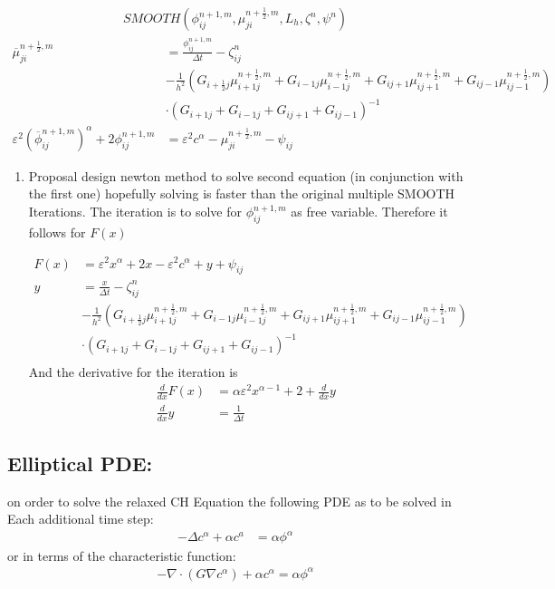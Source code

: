 \documentclass[11pt]{article}
\begin{document}
\begin{align*}
SMOOTH( \phi^{n+1,m}_{ij}, \mu^{n + \frac{1}{2},m}_{ji}, L_h , \zeta ^n , \psi ^n )
\end{align*}
\begin{align*}
\overline{\mu}^{n + \frac{1}{2},m}_{ji}
&=
  \frac{\phi ^{n+1,m}_{ij}}{\Delta t} - \zeta^n_{ij} \\
&- \frac{1}{h^2}(G_{i+\frac{1}{2}j} \mu^{n + \frac{1}{2},m}_{i+1j} +  G_{i-1j} \mu^{n + \frac{1}{2},m}_{i-1j} + G_{ij+1}  \mu^{n + \frac{1}{2},m}_{ij+1} + G_{ij-1} \mu^{n + \frac{1}{2},m}_{ij-1}) \\
&\cdot  (G_{i+1j} + G_{i-1j} + G_{ij+1} + G_{ij-1})^{-1} \\
 \varepsilon ^2 (\overline{\phi} ^{n+1,m}_{ij})^\alpha + 2 \phi ^{n+1,m}_{ij} &= \varepsilon ^2 c^\alpha  -\mu^{n + \frac{1}{2},m}_{ji}  - \psi_{ij}
\end{align*}
\begin{enumerate}
\item Proposal
\label{sec:orgf2731af}
design newton method to solve second equation (in conjunction with the first one) hopefully solving is faster than the original multiple SMOOTH Iterations.
 The iteration is to solve for \(\phi ^{n+1,m}_{ij}\) as free variable. Therefore it follows for \(F(x)\)

\begin{align*}
F(x)  &= \varepsilon ^2 x^\alpha + 2x - \varepsilon^2 c^\alpha  + y + \psi_{ij} \\
y &= \frac{x}{\Delta t} - \zeta^n_{ij} \\
&- \frac{1}{h^2}(G_{i+\frac{1}{2}j} \mu^{n + \frac{1}{2},m}_{i+1j} +  G_{i-1j} \mu^{n + \frac{1}{2},m}_{i-1j} + G_{ij+1}  \mu^{n + \frac{1}{2},m}_{ij+1} + G_{ij-1} \mu^{n + \frac{1}{2},m}_{ij-1}) \\
&\cdot  (G_{i+1j} + G_{i-1j} + G_{ij+1} + G_{ij-1})^{-1} \\
\end{align*}
And the derivative for the iteration is
\begin{align*}
\frac{d}{dx} F(x)&= \alpha \varepsilon^2 x^{\alpha-1} + 2 + \frac{d}{dx} y  \\
\frac{d}{dx} y  &= \frac{1}{\Delta t}
\end{align*}
\end{enumerate}
\subsection{Elliptical PDE:}
\label{sec:orgb36e4e9}
on order to solve the relaxed CH Equation the following PDE as to be solved in Each additional time step:
\begin{align*}
- \Delta c^\alpha  + \alpha c^a &= \alpha \phi ^\alpha
\end{align*}
or in terms of the characteristic function:
\begin{align*}
- \nabla \cdot  (G \nabla c^\alpha) + \alpha c^\alpha  = \alpha \phi ^\alpha
\end{align*}
\end{document}
